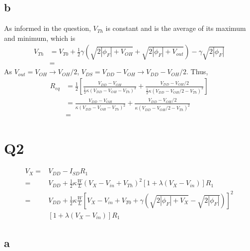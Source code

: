 \documentclass[a4paper,10pt]{article}
\begin{document}
\subsection*{b}
As informed in the question, \begin{math}V_{Th}\end{math} is constant and is the average of its maximum and minimum, which is
\begin{equation}
\begin{split}
V_{Th} &= V_{T0} + \frac{1}{2}\gamma(\sqrt{2|\phi_F| + V_{OH}} + \sqrt{2|\phi_F| + V_{out}}) -\gamma\sqrt{2|\phi_F|}\\
&=
\end{split}
\end{equation}
As \begin{math}V_{out} = V_{OH} \rightarrow V_{OH}/2\end{math}, \begin{math}V_{DS} = V_{DD} - V_{OH} \rightarrow V_{DD} -
V_{OH}/2\end{math}. Thus,
\begin{equation}
\begin{split}
R_{eq} &= \frac{1}{2}\left[ \frac{V_{DD} - V_{OH}}{\frac{1}{2}\kappa(V_{DD}-V_{OH}-V_{Th}) ^2} + \frac{V_{DD} - V_{OH}/2}{\frac{1}{2}\kappa(V_{DD}-V_{OH}/2-V_{Th}) ^2}\right]\\
&= \frac{V_{DD} - V_{OH}}{\kappa(V_{DD}-V_{OH}-V_{Th}) ^2} + \frac{V_{DD} - V_{OH}/2}{\kappa(V_{DD}-V_{OH}/2-V_{Th}) ^2}\\
&=
\end{split}
\end{equation}

\section*{Q2}
\begin{equation}
\begin{split}
V_X =& V_{DD} - I_{SD}R_1\\
=& V_{DD} + \frac{1}{2}\kappa\frac{W}{L}(V_X-V_{in}+V_{Th})^2 [1+\lambda (V_X - V_{in})]R_1\\
=& V_{DD} + \frac{1}{2}\kappa\frac{W}{L}[V_X-V_{in}+V_{T0}+\gamma(\sqrt{2|\phi_F| + V_X} -\sqrt{2|\phi_F|})]^2\\
&[1+\lambda (V_X - V_{in})]R_1
\end{split}
\end{equation}
\subsection*{a}
\end{document}
